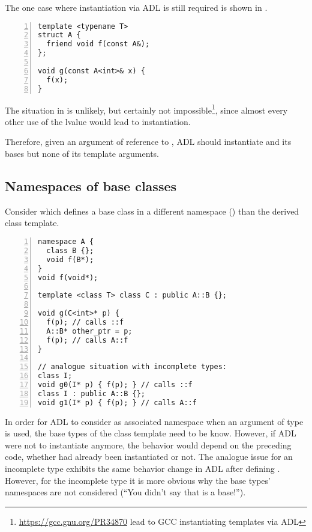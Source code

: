 The one case where instantiation via ADL is still required is shown in 
.
\begin{lstlisting}[style=Vc,numbers=left,float,label=lst:needsInstantiation,caption={
Requires instantiation or reasonable code could break.
}]
template <typename T>
struct A {
  friend void f(const A&);
};

void g(const A<int>& x) {
  f(x);
}
\end{lstlisting}
The situation in  is unlikely, but certainly not 
impossible\footnote{\url{https://gcc.gnu.org/PR34870} lead to GCC instantiating templates 
via ADL}, since almost every other use of the lvalue  would lead to instantiation.

Therefore, given an argument of reference to , ADL should instantiate  and 
its bases but none of its template arguments.

\subsection{Namespaces of base classes}

Consider  which defines a base class in a different namespace 
() than the derived class template.
\begin{lstlisting}[style=Vc,numbers=left,float,label=lst:baseNamespace,caption={
ADL in namespace of base class
}]
namespace A {
  class B {};
  void f(B*);
}
void f(void*);

template <class T> class C : public A::B {};

void g(C<int>* p) {
  f(p); // calls ::f
  A::B* other_ptr = p;
  f(p); // calls A::f
}

// analogue situation with incomplete types:
class I;
void g0(I* p) { f(p); } // calls ::f
class I : public A::B {};
void g1(I* p) { f(p); } // calls A::f
\end{lstlisting}
In order for ADL to consider  as associated namespace when an argument of type 
 is used, the base types of the class template need to be know. However, if 
ADL were not to instantiate  anymore, the behavior would depend on the 
preceding code, whether  had already been instantiated or not. The analogue 
issue for an incomplete type  exhibits the same behavior change in ADL after 
defining . However, for the incomplete type it is more obvious why the base types' 
namespaces are not considered (“You didn't say that  is a base!”).

